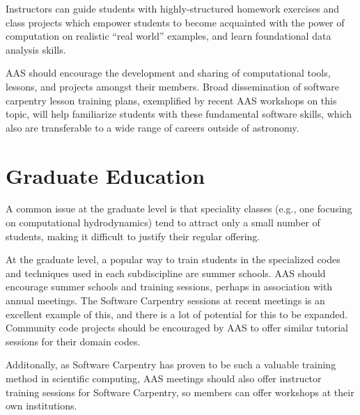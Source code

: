 \documentclass[11pt]{article}
\begin{document}
Instructors can guide students with highly-structured homework exercises and class projects which
empower students to become acquainted with the power of computation on realistic ``real world''
examples, and learn foundational data analysis skills.

AAS should encourage the development and sharing of computational
tools, lessons, and projects amongst their members. Broad dissemination of software carpentry lesson training plans, exemplified
by recent AAS workshops on this topic, will help familiarize students with
these fundamental software skills, which also are transferable to a wide range of careers outside of astronomy.





\section{Graduate Education}

A common issue at the graduate level is that speciality classes (e.g.,
one focusing on computational hydrodynamics) tend to attract only a
small number of students, making it difficult to justify their regular
offering.

At the graduate level, a popular way to train students in the specialized
codes and techniques used in each subdiscipline are summer schools.
AAS should encourage summer schools and training sessions, perhaps in 
association with annual meetings.  The Software Carpentry sessions
at recent meetings is an excellent example of this, and there is 
a lot of potential for this to be expanded.  Community code projects
should be encouraged by AAS to offer similar tutorial sessions for 
their domain codes.  

Additonally, as Software Carpentry has proven to be such a valuable
training method in scientific computing, AAS meetings should also
offer instructor training sessions for Software Carpentry, so members
can offer workshops at their own institutions.
\end{document}
